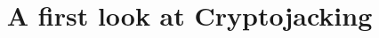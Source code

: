 \documentclass[10pt, conference, compsocconf]{IEEEtran}
\begin{document}
\title{A first look at Cryptojacking}
\author{}
\maketitle




\IEEEpeerreviewmaketitle






\footnotesize

\normalsize

\end{document}
